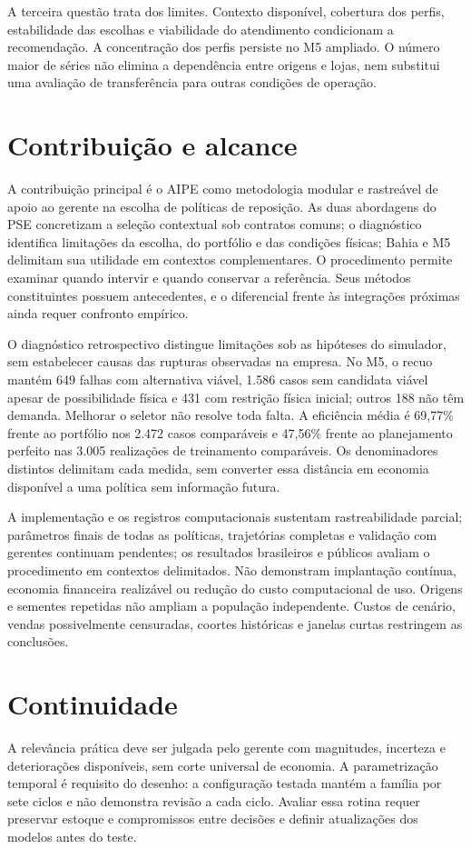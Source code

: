A terceira questão trata dos limites. Contexto disponível, cobertura dos perfis, estabilidade das escolhas e viabilidade do atendimento condicionam a recomendação. A concentração dos perfis persiste no M5 ampliado. O número maior de séries não elimina a dependência entre origens e lojas, nem substitui uma avaliação de transferência para outras condições de operação.

\section{Contribuição e alcance}
A contribuição principal é o AIPE como metodologia modular e rastreável de apoio ao gerente na escolha de políticas de reposição. As duas abordagens do PSE concretizam a seleção contextual sob contratos comuns; o diagnóstico identifica limitações da escolha, do portfólio e das condições físicas; Bahia e M5 delimitam sua utilidade em contextos complementares. O procedimento permite examinar quando intervir e quando conservar a referência. Seus métodos constituintes possuem antecedentes, e o diferencial frente às integrações próximas ainda requer confronto empírico.

O diagnóstico retrospectivo distingue limitações sob as hipóteses do simulador, sem estabelecer causas das rupturas observadas na empresa. No M5, o recuo mantém 649 falhas com alternativa viável, 1.586 casos sem candidata viável apesar de possibilidade física e 431 com restrição física inicial; outros 188 não têm demanda. Melhorar o seletor não resolve toda falta. A eficiência média é 69,77\% frente ao portfólio nos 2.472 casos comparáveis e 47,56\% frente ao planejamento perfeito nas 3.005 realizações de treinamento comparáveis. Os denominadores distintos delimitam cada medida, sem converter essa distância em economia disponível a uma política sem informação futura.

A implementação e os registros computacionais sustentam rastreabilidade parcial; parâmetros finais de todas as políticas, trajetórias completas e validação com gerentes continuam pendentes; os resultados brasileiros e públicos avaliam o procedimento em contextos delimitados. Não demonstram implantação contínua, economia financeira realizável ou redução do custo computacional de uso. Origens e sementes repetidas não ampliam a população independente. Custos de cenário, vendas possivelmente censuradas, coortes históricas e janelas curtas restringem as conclusões.

\section{Continuidade}
A relevância prática deve ser julgada pelo gerente com magnitudes, incerteza e deteriorações disponíveis, sem corte universal de economia. A parametrização temporal é requisito do desenho: a configuração testada mantém a família por sete ciclos e não demonstra revisão a cada ciclo. Avaliar essa rotina requer preservar estoque e compromissos entre decisões e definir atualizações dos modelos antes do teste.


